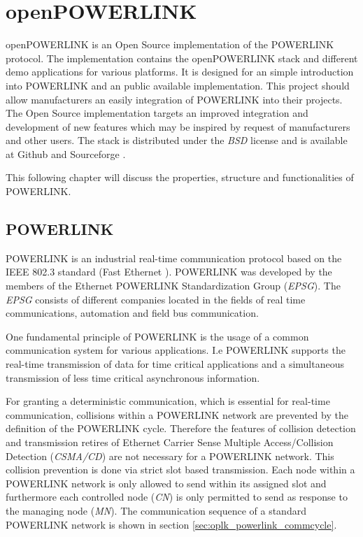 \chapter{openPOWERLINK}
\label{cha:oplk}
openPOWERLINK is an Open Source implementation of the POWERLINK protocol.
The implementation contains the openPOWERLINK stack and different demo applications for various platforms.
It is designed for an simple introduction into POWERLINK and an public available implementation.
This project should allow manufacturers an easily integration of POWERLINK into their projects.
The Open Source implementation targets an improved integration and development of new features which may be inspired by request of manufacturers and other users.
The stack is distributed under the \emph{BSD} license and is available at Github \cite{openpowerlink_github} and Sourceforge \cite{openpowerlink_sourceforge}.

This following chapter will discuss the properties, structure and functionalities of POWERLINK.

\section{POWERLINK}
\label{sec:oplk_powerlink}
POWERLINK is an industrial real-time communication protocol based on the IEEE 802.3 standard (Fast Ethernet \cite{ethernet_ieee_2016}).
POWERLINK was developed by the members of the Ethernet POWERLINK Standardization Group (\emph{EPSG}).
The \emph{EPSG} consists of different companies located in the fields of real time communications, automation and field bus communication. \cite{epsg_hp}

One fundamental principle of POWERLINK is the usage of a common communication system for various applications.
I.e POWERLINK supports the real-time transmission of data for time critical applications and a simultaneous transmission of less time critical asynchronous information.

For granting a deterministic communication, which is essential for real-time communication, collisions within a POWERLINK network are prevented by the definition of the POWERLINK cycle.
Therefore the features of collision detection and transmission retires of Ethernet Carrier Sense Multiple Access/Collision Detection (\emph{CSMA/CD}) are not necessary for a POWERLINK network. \cite[section 4.2]{ethernet_ieee_2016}
This collision prevention is done via strict slot based transmission.
Each node within a POWERLINK network is only allowed to send within its assigned slot and furthermore each controlled node (\emph{CN}) is only permitted to send as response to the managing node (\emph{MN}). \cite[chapter 1]{epsg_epsg_2013}
The communication sequence of a standard POWERLINK network is shown in section \ref{sec:oplk_powerlink_commcycle}.

